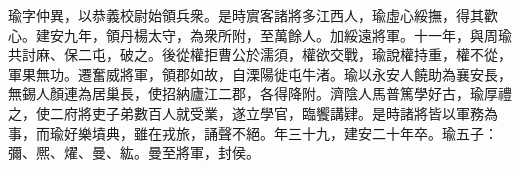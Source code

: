 \begin{pinyinscope}
 
 
 瑜字仲異，以恭義校尉始領兵衆。是時賔客諸將多江西人，瑜虛心綏撫，得其歡心。建安九年，領丹楊太守，為衆所附，至萬餘人。加綏遠將軍。十一年，與周瑜共討麻、保二屯，破之。後從權拒曹公於濡須，權欲交戰，瑜說權持重，權不從，軍果無功。遷奮威將軍，領郡如故，自溧陽徙屯牛渚。瑜以永安人饒助為襄安長，無錫人顏連為居巢長，使招納廬江二郡，各得降附。濟陰人馬普篤學好古，瑜厚禮之，使二府將吏子弟數百人就受業，遂立學官，臨饗講肄。是時諸將皆以軍務為事，而瑜好樂墳典，雖在戎旅，誦聲不絕。年三十九，建安二十年卒。瑜五子：彌、熈、燿、曼、紘。曼至將軍，封侯。
 
 
\end{pinyinscope}
